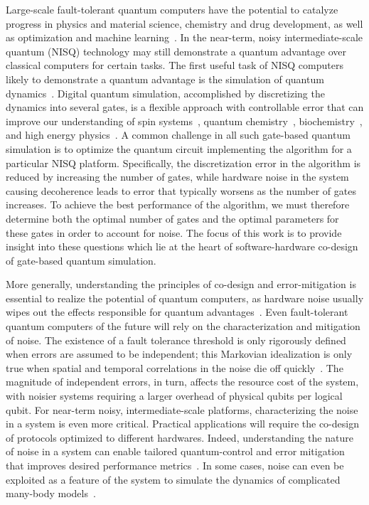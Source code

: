 \documentclass[prx,aps,twocolumn,showpacs,superscriptaddress,10pt]{revtex4-1}
\begin{document}
Large-scale fault-tolerant quantum computers have the potential to catalyze progress in physics and material science, chemistry and drug development, as well as optimization and machine learning~\cite{Preskill2018, Georgescu2014}. In the near-term, noisy intermediate-scale quantum (NISQ) technology may still demonstrate a quantum advantage over classical computers for certain tasks. The first useful task of NISQ computers likely to demonstrate a quantum advantage is the simulation of quantum dynamics~\cite{Childs2018, Preskill2018, quantumLeap2019}. Digital quantum simulation, accomplished by discretizing the dynamics into several gates, is a flexible approach with controllable error that can improve our understanding of spin systems~\cite{Lanyon2011, Salathe2015}, quantum chemistry~\cite{Kassal2008,OMalley2016}, biochemistry~\cite{Sels2020}, and high energy physics~\cite{Hauke2013, Martinez2016}. A common challenge in all such gate-based quantum simulation is to optimize the quantum circuit implementing the algorithm for a particular NISQ platform. Specifically, the discretization error in the algorithm is reduced by increasing the number of gates, while hardware noise in the system causing decoherence leads to error that typically worsens as the number of gates increases. To achieve the best performance of the algorithm, we must therefore determine both the optimal number of gates and the optimal parameters for these gates in order to account for noise. The focus of this work is to provide insight into these questions which lie at the heart of software-hardware co-design of gate-based quantum simulation.

More generally, understanding the principles of co-design and error-mitigation is essential to realize the potential of quantum computers, as hardware noise usually wipes out the effects responsible for quantum advantages~\cite{Ladd2010}. Even fault-tolerant quantum computers of the future will rely on the characterization and mitigation of noise. The existence of a fault tolerance threshold is only rigorously defined when errors are assumed to be independent; this Markovian idealization is only true when spatial and temporal correlations in the noise die off quickly~\cite{Nielsen2000, Ng2009, Preskill2012}. The magnitude of independent errors, in turn, affects the resource cost of the system, with noisier systems requiring a larger overhead of physical qubits per logical qubit. For near-term noisy, intermediate-scale platforms, characterizing the noise in a system is even more critical. Practical applications will require the co-design of protocols optimized to different hardwares. Indeed, understanding the nature of noise in a system can enable tailored quantum-control and error mitigation that improves desired performance metrics~\cite{Paz_Silva_2016, Layden2018}. In some cases, noise can even be exploited as a feature of the system to simulate the dynamics of complicated many-body models~\cite{Stannigel2014}.
\end{document}

